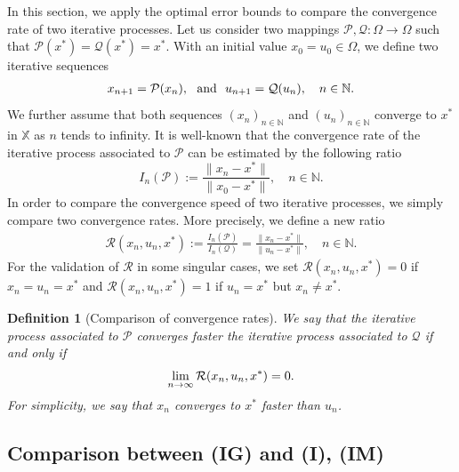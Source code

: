 \documentclass[a4paper, 11pt]{article}
\newtheorem{definition}[theorem]{Definition}
\begin{document}
In this section, we apply the optimal error bounds to compare the convergence rate of two iterative processes. Let us consider two mappings $\mathcal{P}, \mathcal{Q}: \Omega \to \Omega$ such that $\mathcal{P}(x^*)=\mathcal{Q}(x^*)=x^*$. With an initial value $x_0 = u_0 \in \Omega$, we define two iterative sequences
\begin{align}\notag
x_{n+1} = \mathcal{P}(x_n), \ \mbox{ and } \ 
u_{n+1} = \mathcal{Q}(u_n), \quad n \in \mathbb{N}.
\end{align}
We further assume that both sequences $(x_n)_{n \in \mathbb{N}}$ and  $(u_n)_{n \in \mathbb{N}}$ converge to $x^*$ in $\mathbb{X}$ as $n$ tends to infinity. It is well-known that the convergence rate of the iterative process associated to $\mathcal{P}$ can be estimated by the following ratio 
$$I_n(\mathcal{P}) := \frac{\|x_n-x^*\|}{\|x_0-x^*\|}, \quad n \in \mathbb{N}.$$ 
In order to compare the convergence speed of two iterative processes, we simply compare two convergence rates. More precisely, we define a new ratio
\begin{align}\label{ratio-R}
\mathcal{R}(x_n,u_n,x^*) := \frac{I_n(\mathcal{P})}{I_n(\mathcal{Q})} = \frac{\|x_n-x^*\|}{\|u_n-x^*\|}, \quad n \in \mathbb{N}.
\end{align}
For the validation of $\mathcal{R}$ in some singular cases, we set $\mathcal{R}(x_n,u_n,x^*) = 0$ if $x_n = u_n = x^*$ and $\mathcal{R}(x_n,u_n,x^*) = 1$ if $u_n = x^*$ but $x_n \neq x^*$.


\begin{definition}[Comparison of convergence rates]
\label{def-conv-rate}
We say that the iterative process associated to $\mathcal{P}$ converges faster the iterative process associated to $\mathcal{Q}$ if and only if
\begin{align}\notag %
\lim\limits_{n \to \infty} \mathcal{R}(x_n,u_n,x^*) = 0.
\end{align}
For simplicity, we say that $x_n$ converges to $x^*$ faster than $u_n$.
\end{definition}

\subsection{Comparison between (IG) and (I), (IM)}
\end{document}
